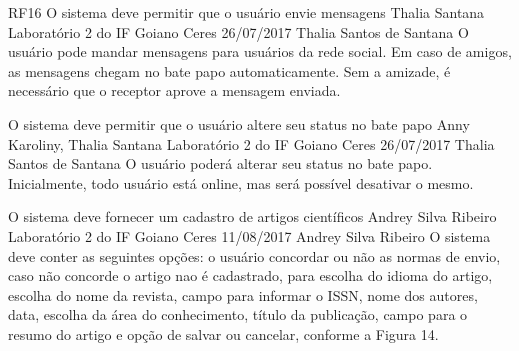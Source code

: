  \requisitoFuncional
 {RF16}
 {O sistema deve permitir que o  usuário envie mensagens}
 {Thalia Santana}
 {Laboratório 2 do IF Goiano Ceres}
 {26/07/2017}
 {Thalia Santos de Santana}
 {O usuário pode mandar mensagens para usuários da rede social. Em caso de amigos, as mensagens chegam no bate papo automaticamente. Sem a amizade, é necessário que o receptor aprove a mensagem enviada.
 }
 
 {O sistema deve permitir que o usuário altere seu status no bate papo}
 {Anny Karoliny, Thalia Santana}
 {Laboratório 2 do IF Goiano Ceres}
 {26/07/2017}
 {Thalia Santos de Santana}
 { O usuário poderá alterar seu status no bate papo. Inicialmente, todo usuário está online, mas será possível desativar o mesmo.
 }	
 


 {O sistema deve fornecer um cadastro de artigos científicos}
 {Andrey Silva Ribeiro}
 {Laboratório 2 do IF Goiano Ceres}
 {11/08/2017}
 {Andrey Silva Ribeiro}
 { O sistema deve conter as seguintes opções: o usuário concordar ou não as normas de envio, caso não concorde o artigo nao é cadastrado, para escolha do idioma do artigo, escolha do nome da revista, campo para informar o ISSN, nome dos autores, data, escolha da área do conhecimento, título da publicação, campo para o resumo do artigo e opção de salvar ou cancelar, conforme a Figura 14.
 }